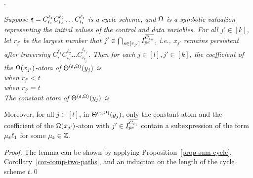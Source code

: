 \begin{appendix}
.
{\it 
	Suppose ${\mathfrak{s} }=C_{i_1}^{\ell_1} C_{i_2}^{\ell_2} \dots C_{i_t}^{\ell_t}$ is a cycle scheme, and $\Omega$ is a symbolic valuation representing the initial values of the control and data variables. 
	For all $j'\in[k]$, let $r_{j'}$ be the largest number that $j'\in\bigcap_{s\in[r_{j'}]} I^{\overline{C_{i_{s}}}}_{pe}$, i.e., $x_{j'}$ remains persistent after traversing $C_{i_1}^{\ell_1} C_{i_2}^{\ell_2} \dots C_{i_{r_j}}^{\ell_{r_{j'}}}$.
	Then for each $j\in [l], j' \in[k]$, the coefficient of the $\Omega(x_{j'})$-atom of $\Theta^{({\mathfrak{s} },\Omega)}(y_j)$ is\smallskip\\
	 when $r_{j'}<t$\smallskip\\
	 \hspace{2.55cm} when $r_{j'}=t$\smallskip\\
	The constant atom of $\Theta^{({\mathfrak{s} },\Omega)}(y_j)$ is 
	\begin{center}
	\end{center}
	Moreover, for all $j \in [l]$, in $\Theta^{({\mathfrak{s} },\Omega)}(y_j)$, only the constant atom and the coefficient of the $\Omega(x_{j'})$-atom with $j' \in  I^{\overline{C_{i_{1}}}}_{pe}$ contain a subexpression of the form $ \mu_{\mathfrak{s} } \ell_1$ for some $\mu_{\mathfrak{s} }\in {\mathbb{Z} }$.
}

\begin{proof}
The lemma can be shown by applying Proposition~\ref{prop-sum-cycle}, Corollary~\ref{cor-comp-two-paths}, and an induction on the length of the cycle scheme $t$.\qed
\end{proof}



\end{appendix}
